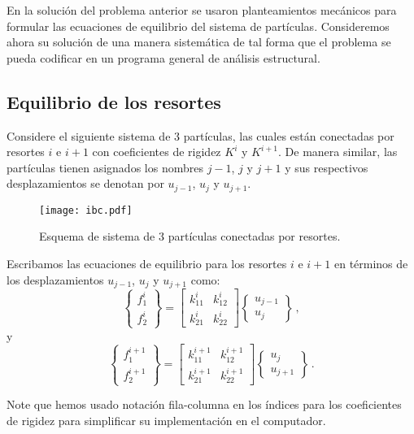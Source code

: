 En la solución del problema anterior se usaron planteamientos mecánicos para 
formular las ecuaciones de equilibrio del sistema de partículas. Consideremos 
ahora su solución de una manera sistemática de tal forma que el problema se 
pueda codificar en un programa general de análisis estructural.

\subsection{Equilibrio de los resortes}\hfill\break

Considere el siguiente sistema de 3 partículas, las cuales están conectadas por 
resortes $i$ e $i+1$ con coeficientes de rigidez $K^i$ y $K^{i+1}$. De manera 
similar, las partículas tienen asignados los nombres $j-1$, $j$ y $j+1$ y sus 
respectivos desplazamientos se denotan por $u_{j-1}$, $u_{j}$ y $u_{j+1}$.
\begin{figure}[H]
\centering
\texttt{[image: ibc.pdf]}
\caption{Esquema de sistema de 3 partículas conectadas por resortes.}
\label{fig:ibc}
\end{figure}


Escribamos las ecuaciones de equilibrio para los resortes $i$ e $i+1$ en 
términos de los desplazamientos $u_{j - 1}$, $u_j$ y $u_{j + 1}$ como:
$$\begin{Bmatrix} f_1^i\\ f_2^i \end{Bmatrix}
= \begin{bmatrix}
k_{11}^i & k_{12}^i\\
k_{21}^i & k_{22}^i
\end{bmatrix}
\begin{Bmatrix} u_{j - 1}\\ u_j \end{Bmatrix}\, ,$$
y
$$\begin{Bmatrix} f_1^{i + 1}\\ f_2^{i + 1}\end{Bmatrix}
= \begin{bmatrix}
k_{11}^{i + 1} & k_{12}^{i + 1}\\
k_{21}^{i + 1} & k_{22}^{i + 1} \end{bmatrix}
\begin{Bmatrix} u_j\\ u_{j + 1} \end{Bmatrix}\, .$$

Note que hemos usado notación fila-columna en los índices para los coeficientes 
de rigidez para simplificar su implementación en el computador.


